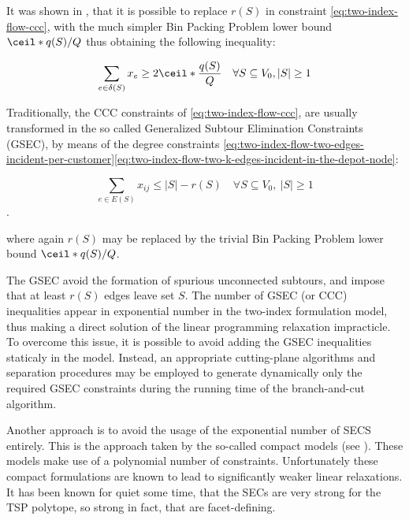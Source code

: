 It was shown in \textcite{cornuejols1993}, that it is possible to replace $r(S)$ in constraint
\eqref{eq:two-index-flow-ccc}, with the much simpler Bin Packing Problem lower bound $\ceil*{q(S) / Q}$
thus obtaining the following inequality:

\begin{equation}
    \sum_{e \in \delta(S)} x_e \ge 2 \ceil*{\frac{q(S)}{Q}}   \quad \forall S \subseteq V_0, |S| \ge 1 \label{eq:two-index-flow-ccc-bpp-lower-bound}                                                             \\
\end{equation}

Traditionally, the CCC constraints of \eqref{eq:two-index-flow-ccc}, are usually transformed in the so called Generalized Subtour Elimination Constraints (GSEC),
by means of the degree constraints \eqref{eq:two-index-flow-two-edges-incident-per-customer}\eqref{eq:two-index-flow-two-k-edges-incident-in-the-depot-node}:

\begin{equation}\label{eq:cvrp-2flow-gsec}
	\sum_{e \in E(S)} x_{ij} \le |S| - r(S) \quad \forall S \subseteq V_0,\ |S| \ge 1
\end{equation}.

where again $r(S)$ may be replaced by the trivial Bin Packing Problem lower bound $\ceil*{q(S) / Q}$.

The GSEC avoid the formation of spurious unconnected subtours, and impose that at least $r(S)$ edges leave set $S$.
The number of GSEC (or CCC) inequalities appear in exponential number in the two-index formulation model,
thus making a direct solution of the linear programming relaxation impracticle.
To overcome this issue, it is possible to avoid adding the GSEC inequalities staticaly in the model.
Instead, an appropriate cutting-plane algorithms and separation procedures may be employed to generate dynamically only the required
GSEC constraints during the running time of the branch-and-cut algorithm.

Another approach is to avoid the usage of the exponential number of SECS entirely.
This is the approach taken by the so-called compact models (see \cite{miller1960, christofides1979, desrochers1991}).
These models make use of a polynomial number of constraints.
Unfortunately these compact formulations are known to lead to significantly weaker linear relaxations.
It has been known for quiet some time, that the SECs are very strong for the TSP polytope, so strong in fact, that are facet-defining.


